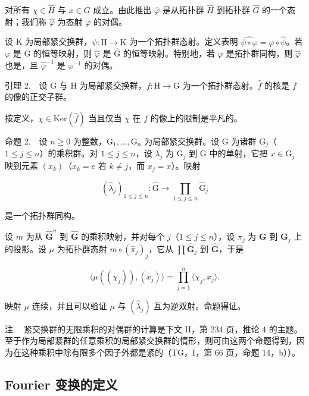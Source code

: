 对所有 \(\chi\in\widehat{H}\) 与 \(x\in G\) 成立。由此推出 \(\widehat{\varphi}\) 是从拓扑群 \(\widehat{H}\) 到拓扑群 \(\widehat{G}\) 的一个态射；我们称 \(\widehat{\varphi}\) 为态射 \(\varphi\) 的对偶。

设 K 为局部紧交换群，\(\psi\colon\mathrm{H}\to\mathrm{K}\) 为一个拓扑群态射。定义表明 \(\widehat{\psi\circ\varphi}=\widehat{\varphi}\circ\widehat{\psi}\)。若 \(\varphi\) 是 G 的恒等映射，则 \(\widehat{\varphi}\) 是 \(\widehat{\mathrm{G}}\) 的恒等映射。特别地，若 \(\varphi\) 是拓扑群同构，则 \(\widehat{\varphi}\) 也是，且 \(\widehat{\varphi}^{-1}\) 是 \(\varphi^{-1}\) 的对偶。

引理 2.　设 G 与 H 为局部紧交换群，\(f\colon\mathrm{H}\to\mathrm{G}\) 为一个拓扑群态射。\(\widehat{f}\) 的核是 \(f\) 的像的正交子群。

按定义，\(\chi \in \mathrm{Ker}(\widehat{f})\) 当且仅当 \(\chi\) 在 \(f\) 的像上的限制是平凡的。

命题 2.　设 \(n \geqslant 0\) 为整数，\(\mathrm{G}_{1}, \ldots, \mathrm{G}_{n}\) 为局部紧交换群。设 G 为诸群 \(\mathrm{G}_{j}\)（\(1 \leqslant j \leqslant n\)）的乘积群。对 \(1 \leqslant j \leqslant n\)，设 \(\lambda_{j}\) 为 \(\mathrm{G}_{j}\) 到 G 中的单射，它把 \(x \in \mathrm{G}_{j}\) 映到元素 \((x_{k})\)（\(x_{k} = e\) 若 \(k \neq j\)，而 \(x_{j} = x\)）。映射

\[
(\widehat {\lambda} _ {j}) _ {1 \leqslant j \leqslant n} \colon \widehat {\mathrm{G}} \to \prod_ {1 \leqslant j \leqslant n} \widehat {\mathrm{G}} _ {j}
\]

是一个拓扑群同构。

设 \(m\) 为从 \(\widehat{\mathbf{G}}^n\) 到 \(\widehat{\mathbf{G}}\) 的乘积映射，并对每个 \(j\)（\(1 \leqslant j \leqslant n\)），设 \(\pi_j\) 为 \(\mathbf{G}\) 到 \(\mathbf{G}_j\) 上的投影。设 \(\mu\) 为拓扑群态射 \(m \circ (\widehat{\pi}_j)_j\)，它从 \(\prod \widehat{\mathbf{G}}_j\) 到 \(\widehat{\mathbf{G}}\)，于是

\[
\langle \mu ((\chi_ {j})), (x _ {j}) \rangle = \prod_ {j = 1} ^ {n} \langle \chi_ {j}, x _ {j} \rangle .
\]

映射 \(\mu\) 连续，并且可以验证 \(\mu\) 与 \((\widehat{\lambda}_j)\) 互为逆双射。命题得证。

注.　紧交换群的无限乘积的对偶群的计算是下文 II，第 234 页，推论 4 的主题。至于作为局部紧群的任意乘积的局部紧交换群的情形，则可由这两个命题得到，因为在这种乘积中除有限多个因子外都是紧的（TG，I，第 66 页，命题 14，b））。

\subsection{Fourier 变换的定义}


